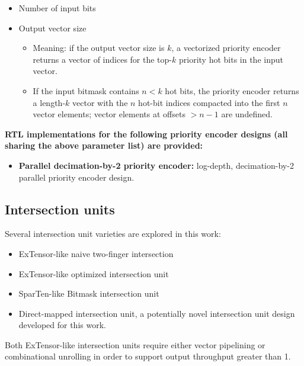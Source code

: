 \begin{itemize}
    \item Number of input bits
    \item Output vector size
    
    \begin{itemize}
        \item Meaning: if the output vector size is $k$, a vectorized priority encoder returns a vector of indices for the top-$k$ priority hot bits in the input vector. 
        \item If the input bitmask contains $n < k$ hot bits, the priority encoder returns a length-$k$ vector with the $n$ hot-bit indices compacted into the first $n$ vector elements; vector elements at offsets $>n-1$ are undefined.
    \end{itemize}

\end{itemize}

\textbf{RTL implementations for the following priority encoder designs (all sharing the above parameter list) are provided:}

\begin{itemize}
    \item \textbf{Parallel decimation-by-2 priority encoder\cite{recursive_priority_encoder}:} log-depth, decimation-by-2 parallel priority encoder design.
\end{itemize}

\subsection{Intersection units}

Several intersection unit varieties are explored in this work:

\begin{itemize}
    \item ExTensor-like\cite{extensor} naive two-finger intersection
    \item ExTensor-like\cite{extensor} optimized intersection unit
    \item SparTen-like\cite{sparten} Bitmask intersection unit
    \item Direct-mapped intersection unit, a potentially novel intersection unit design developed for this work.
\end{itemize}

Both ExTensor-like intersection units require either vector pipelining or combinational unrolling in order to support output throughput greater than 1.

